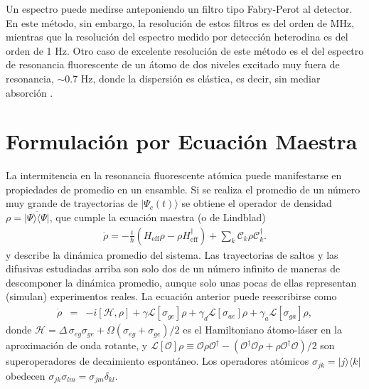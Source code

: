 \documentclass[superscriptaddress,12pt,amsmath]{revtex4-2}
\begin{document}
Un espectro puede medirse anteponiendo un filtro tipo Fabry-Perot al 
detector. En este m\'etodo, sin embargo, la resoluci\'on de estos filtros 
es del orden de MHz, mientras que la resoluci\'on del espectro medido 
por detecci\'on heterodina \cite{BuTa00} es del orden de 1 Hz. Otro caso 
de excelente resoluci\'on de este m\'etodo es el del espectro de 
resonancia fluorescente de un \'atomo de dos niveles excitado muy 
fuera de resonancia, $\sim 0.7$ Hz, donde la dispersi\'on es el\'astica, 
es decir, sin mediar absorci\'on \cite{Walther97}.

\section{Formulaci\'on por Ecuaci\'on Maestra}
La intermitencia en la resonancia fluorescente at\'omica puede 
manifestarse en propiedades de promedio en un ensamble.  Si se realiza el 
promedio de un n\'umero muy grande de trayectorias de $|\Psi_c(t)\rangle$ 
se obtiene el operador de densidad 
$\rho= \overline{ | \Psi \rangle \langle \Psi | }$, que cumple la ecuaci\'on 
maestra (o de Lindblad) 
%
\begin{eqnarray}
\dot{\rho} = -\frac{i}{\hbar} (H_{\mathrm{eff}} \rho -\rho H_{\mathrm{eff}}^{\dag} )
	+\sum_k \mathcal{C}_k \rho \mathcal{C}_k^\dag .
\end{eqnarray}
y describe la din\'amica promedio del sistema. Las trayectorias de saltos 
y las difusivas estudiadas arriba son solo dos de un n\'umero infinito de 
maneras de descomponer la din\'amica promedio, aunque solo unas 
pocas de ellas representan (simulan) experimentos reales. La ecuaci\'on 
anterior puede reescribirse como 
%
\begin{eqnarray}
\dot{\rho} &=& -i [\mathcal{H},\rho] +{\gamma}\mathcal{L}[\sigma_{ge}] \rho 
	+{\gamma_d} \mathcal{L}[\sigma_{ae}] \rho 	
	+ {\gamma_a} \mathcal{L}[\sigma_{ga}] \rho   , 
\end{eqnarray}
donde $\mathcal{H} = \Delta \, \sigma_{eg} \sigma_{ge} 
	+\Omega ( \sigma_{eg} +\sigma_{ge})/2$ 
es el Hamiltoniano \'atomo-l\'aser en la aproximaci\'on de onda rotante, y 
$\mathcal{L}[\mathcal{O}]\rho \equiv \mathcal{O}\rho\mathcal{O}^\dagger 
 - (\mathcal{O}^\dagger\mathcal{O}\rho 
+\rho\mathcal{O}^\dagger\mathcal{O})/2$ 
son superoperadores de decaimiento espont\'aneo. Los operadores 
at\'omicos  $\sigma_{jk} = |j \rangle\langle k|$ obedecen 
$\sigma_{jk} \sigma_{lm} = \sigma_{jm} \delta_{kl}$.  
\end{document}
